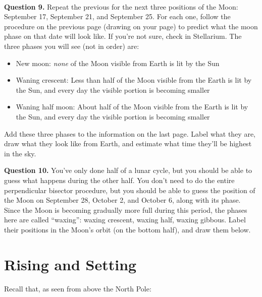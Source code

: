 \documentclass[11pt]{article}
\begin{document}
\vspace*{1.5cm}

\hrulefill\\
\newpage

\textbf{Question 9.} Repeat the previous for the next three positions of the Moon: September 17, September 21, and September 25. 
For each one, follow the procedure on the previous page (drawing on your page) to predict what the moon phase on that date will look like.
If you're not sure, check in Stellarium. The three phases you will see (not in order) are:

\begin{itemize}
	\item New moon: {\it none} of the Moon visible from Earth is lit by the Sun
	\item Waning crescent: Less than half of the Moon visible from the Earth is lit by the Sun, and every day the visible portion is becoming smaller
	\item Waning half moon: About half of the Moon visible from the Earth is lit by the Sun, and every day the visible portion is becoming smaller
\end{itemize}

Add these three phases to the information on the last page. Label what they are, draw what they look like from Earth, and 
estimate what time they'll be highest in the sky.

\vspace{1in}

\textbf{Question 10.} You've only done half of a lunar cycle, but you should be able to guess what happens during the other half.
You don't need to do the entire perpendicular bisector procedure, but you should be able to guess the position of the Moon on 
September 28, October 2, and October 6, along with its phase. Since the Moon is becoming gradually more full during this period, 
the phases here are called ``waxing'': waxing crescent, waxing half, waxing gibbous. Label their positions in the Moon's orbit (on the bottom half), and draw them below.

\newpage

\section{Rising and Setting}

Recall that, as seen from above the North Pole:
\end{document}
